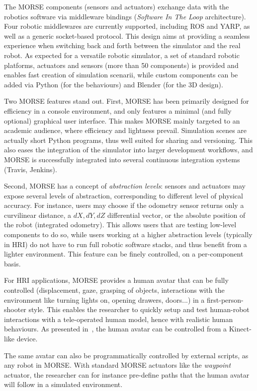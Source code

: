 \documentclass[conference]{IEEEtran}
\begin{document}
The MORSE components (sensors and actuators) exchange data with the robotics
software via middleware bindings (\emph{Software In The Loop} architecture).
Four robotic middlewares are currently supported, including ROS and YARP, as
well as a generic socket-based protocol. This design aims at providing a
seamless experience when switching back and forth between the simulator and the
real robot. As expected for a versatile robotic simulator, a set of standard
robotic platforms, actuators and sensors (more than 50 components) is
provided and enables fast creation of simulation scenarii, while custom
components can be added via Python (for the behaviours) and Blender (for the 3D
design).

Two MORSE features stand out. First, MORSE has been primarily designed for
efficiency in a console environment, and only features a minimal (and fully
optional) graphical user interface. This makes MORSE mainly targeted to an
academic audience, where efficiency and lightness prevail.  Simulation scenes
are actually short Python programs, thus well suited for sharing and versioning.
This also eases the integration of the simulator into larger development
workflows, and MORSE is successfully integrated into several continuous
integration systems (Travis, Jenkins).

Second, MORSE has a concept of \emph{abstraction levels}: sensors and actuators
may expose several levels of abstraction, corresponding to different level of
physical accuracy. For instance, users may choose if the odometry sensor returns
only a curvilinear distance, a $dX, dY, dZ$ differential vector, or the absolute
position of the robot (integrated odometry). This allows users that are testing
low-level components to do so, while users working at a higher abstraction
levels (typically in HRI) do not have to run full robotic software stacks, and
thus benefit from a lighter environment. This feature can be finely controlled,
on a per-component basis.

For HRI applications, MORSE provides a human avatar that can be fully controlled
(displacement, gaze, grasping of objects, interactions with the environment like
turning lights on, opening drawers, doors...) in a first-person-shooter style.
This enables the researcher to quickly setup and test human-robot interactions
with a tele-operated human model, hence with realistic human behaviours. As
presented in~\cite{lemaignan2012morse}, the human avatar can be controlled from
a Kinect-like device.

The same avatar can also be programmatically controlled by external scripts, as
any robot in MORSE. With standard MORSE actuators like the \emph{waypoint}
actuator, the researcher can for instance pre-define paths that the human avatar
will follow in a simulated environment.
\end{document}
